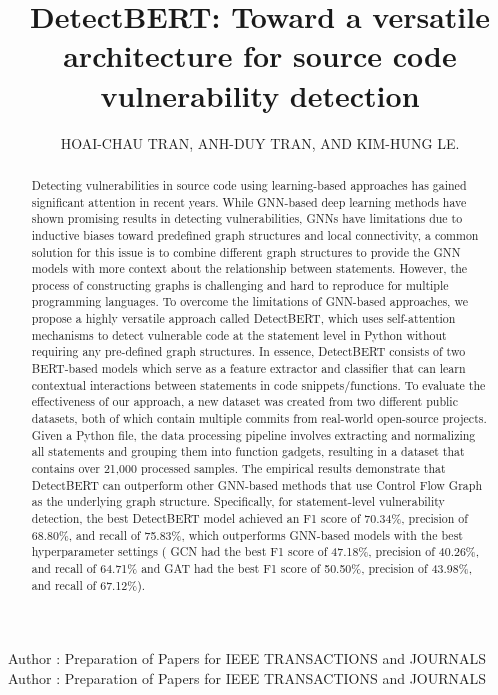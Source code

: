 \documentclass{ieeeaccess}
\begin{document}

\title{DetectBERT: Toward a versatile architecture for source code vulnerability detection}
\author{\uppercase{Hoai-Chau Tran},
\uppercase{Anh-Duy Tran, and Kim-Hung Le}.}
\address[1]{University of Science, Ho Chi Minh City, Vietnam (e-mail: author@boulder.nist.gov)}
\address[2]{University of Information Technology, Ho Chi Minh City, Vietnam (e-mail: author@lamar.colostate.edu)}
\address[3]{Vietnam National University, Ho Chi Minh City, Vietnam}
\address[4]{imec-DistriNet, KU Leuven, Leuven, Belgium}
\markboth
{Author \headeretal: Preparation of Papers for IEEE TRANSACTIONS and JOURNALS}
{Author \headeretal: Preparation of Papers for IEEE TRANSACTIONS and JOURNALS}


\begin{abstract} 
Detecting vulnerabilities in source code using learning-based approaches has gained significant attention in recent years. While GNN-based deep learning methods have shown promising results in detecting vulnerabilities, GNNs have limitations due to inductive biases toward predefined graph structures and local connectivity,  a common solution for this issue is to combine different graph structures to provide the GNN models with more context about the relationship between statements. However, the process of constructing graphs is challenging and hard to reproduce for multiple programming languages.  To overcome the limitations of GNN-based approaches, we propose a highly versatile approach called DetectBERT,  which uses self-attention mechanisms to detect vulnerable code at the statement level in Python without requiring any pre-defined graph structures. In essence, DetectBERT consists of two BERT-based models which serve as a feature  extractor and classifier that can learn contextual interactions between statements in  code snippets/functions. To evaluate the effectiveness of our approach,  a new dataset was created from two different public datasets, both of which contain multiple commits from real-world open-source projects. Given a Python file, the data processing pipeline involves extracting and normalizing all statements and  grouping them into function gadgets, resulting in a dataset that contains over 21,000 processed samples.  The empirical results demonstrate that DetectBERT can outperform other GNN-based methods that use Control Flow Graph as the underlying graph structure. Specifically, for statement-level vulnerability detection, the best DetectBERT model achieved an F1 score of 70.34\%, precision of 68.80\%, and recall of 75.83\%, which outperforms GNN-based models with the best hyperparameter settings ( GCN had the best  F1 score of 47.18\%, precision of 40.26\%, and recall of 64.71\% and GAT  had the best F1 score of 50.50\%, precision of 43.98\%, and recall of 67.12\%). 
\end{abstract}
\end{document}
